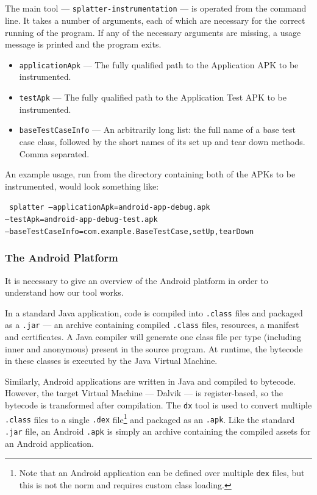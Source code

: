\subsection{\splatterinst{}}

The main tool --- {\tt splatter-instrumentation} --- is operated from the
command line. It takes a number of arguments, each of which are necessary for
the correct running of the program. If any of the necessary arguments are
missing, a usage message is printed and the program exits.

\begin{itemize}
    \item {\tt applicationApk} --- The fully qualified path to the Application
    APK to be instrumented.
    \item {\tt testApk} --- The fully qualified path to the Application Test APK
    to be instrumented.
    \item {\tt baseTestCaseInfo} --- An arbitrarily long list: the full name of
    a base test case class, followed by the short names of its set up and tear
    down methods. Comma separated.
\end{itemize}

An example usage, run from the directory containing both of the APKs to be
instrumented, would look something like:

\texttt{
  splatter --applicationApk=android-app-debug.apk\\
  --testApk=android-app-debug-test.apk\\
  --baseTestCaseInfo=com.example.BaseTestCase,setUp,tearDown
}

\subsubsection{The Android Platform}

It is necessary to give an overview of the Android platform in order to
understand how our \splatterinst{} tool works.

In a standard Java application, code is compiled into {\tt .class} files and
packaged as a {\tt .jar} --- an archive containing compiled {\tt .class} files,
resources, a manifest and certificates. A Java compiler will generate one class
file per type (including inner and anonymous) present in the source program. At
runtime, the bytecode in these classes is executed by the Java Virtual Machine.

Similarly, Android applications are written in Java and compiled to bytecode.
However, the target Virtual Machine --- Dalvik --- is register-based, so the
bytecode is transformed after compilation. The {\tt dx} tool is used to convert
multiple {\tt .class} files to a single {\tt .dex} file\footnote{Note that an
Android application can be defined over multiple {\tt dex} files, but this is
not the norm and requires custom class loading.} and packaged as an {\tt .apk}.
Like the standard {\tt .jar} file, an Android {\tt .apk} is simply an archive
containing the compiled assets for an Android application.

